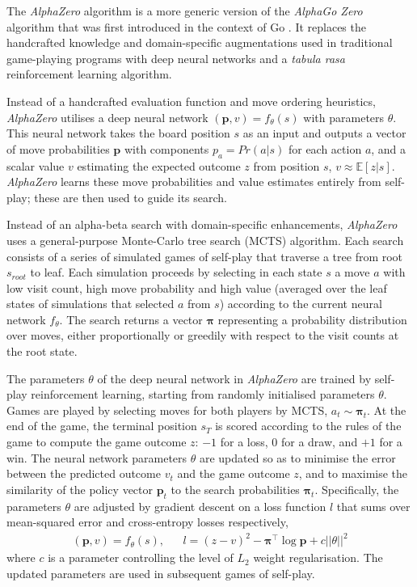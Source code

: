 \documentclass[12pt]{article}
\begin{document}
The \emph{AlphaZero} algorithm is a more generic version of the \emph{AlphaGo Zero} algorithm that was first introduced in the context of Go \cite{Silver17AG0}. It replaces the handcrafted knowledge and domain-specific augmentations used in traditional game-playing programs with deep neural networks and a \emph{tabula rasa} reinforcement learning algorithm. 

Instead of a handcrafted evaluation function and move ordering heuristics, \emph{AlphaZero} utilises a deep neural network $(\mathbf{p},v) = f_\theta(s)$ with parameters $\theta$. This neural network takes the board position $s$ as an input and outputs a vector of move probabilities $\mathbf{p}$ with components $p_a = Pr(a|s)$ for each action $a$, and a scalar value $v$ estimating the expected outcome $z$ from position $s$, $v \approx \mathbb{E}[z | s]$. \emph{AlphaZero} learns these move probabilities and value estimates entirely from self-play; these are then used to guide its search. 

Instead of an alpha-beta search with domain-specific enhancements, \emph{AlphaZero} uses a general-purpose Monte-Carlo tree search (MCTS) algorithm. 
Each search consists of a series of simulated games of self-play that traverse a tree from root $s_{root}$ to leaf. Each simulation proceeds by selecting in each state $s$ a move $a$ with low visit count, high move probability and high value (averaged over the leaf states of simulations that selected $a$ from $s$) according to the current neural network $f_\theta$. The search returns a vector $\mathbf{\pi}$ representing a probability distribution over moves, either proportionally or greedily with respect to the visit counts at the root state. 

The parameters $\theta$ of the deep neural network in \emph{AlphaZero} are trained by self-play reinforcement learning, starting from randomly initialised parameters $\theta$. Games are played by selecting moves for both players by MCTS, $a_t \sim \pmb{\pi}_t$. At the end of the game, the terminal position $s_T$ is scored according to the rules of the game to compute the game outcome $z$: $-1$ for a loss, $0$ for a draw, and $+1$ for a win. The neural network parameters $\theta$ are updated so as to minimise the error between the predicted outcome $v_t$ and the game outcome $z$, and to maximise the similarity of the policy vector $\mathbf{p}_t$ to the search probabilities $\pmb{\pi}_t$.  Specifically, the parameters $\theta$ are adjusted by gradient descent on a loss function $l$ that sums over mean-squared error and cross-entropy losses respectively, 
\begin{align}
(\mathbf{p}, v) = f_\theta(s), &&
l = (z - v)^2 - \pmb{\pi}^\top \log \mathbf{p} + c ||\theta||^2
\label{eqn:loss}
\end{align}
where $c$ is a parameter controlling the level of $L_2$ weight regularisation.
The updated parameters are used in subsequent games of self-play.
\end{document}
